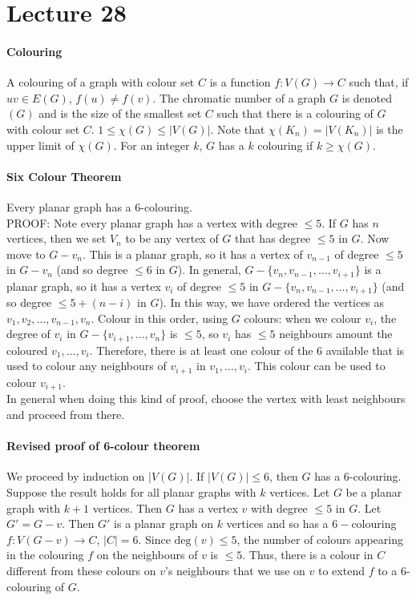 \documentclass[10pt,letter]{article}
\begin{document}
\section*{Lecture 28}
\paragraph{Colouring}
A colouring of a graph with colour set $C$ is a function $f:V(G)\rightarrow C$ such that, if $uv\in E(G)$, $f(u)\neq f(v)$. The chromatic number of a graph $G$ is denoted \raisebox{2pt}{$\chi$}$(G)$ and is the size of the smallest set $C$ such that there is a colouring of $G$ with colour set $C$. $1\leq\chi(G)\leq|V(G)|$. Note that $\chi(K_n)=|V(K_n)|$ is the upper limit of $\chi(G)$. For an integer $k$, $G$ has a $k$ colouring if $k\geq \chi(G)$. 
\paragraph{Six Colour Theorem}
Every planar graph has a 6-colouring. \\ 
PROOF: Note every planar graph has a vertex with degree $\leq5$. If $G$ has $n$ vertices, then we set $V_n$ to be any vertex of $G$ that has degree $\leq5$ in $G$. Now move to $G-v_n$. This is a planar graph, so it has a vertex of $v_{n-1}$ of degree $\leq5$ in $G-v_n$ (and so degree $\leq6$ in $G$). In general, $G-\{v_n,v_{n-1},\ldots,v_{i+1}\}$ is a planar graph, so it has a vertex $v_i$ of degree $\leq5$ in $G-\{v_n,v_{n-1},\ldots,v_{i+1}\}$ (and so degree $\leq5+(n-i)$ in $G$). In this way, we have ordered the vertices as $v_1,v_2,\ldots,v_{n-1},v_n$. Colour in this order, using $G$ colours: when we colour $v_i$, the degree of $v_i$ in $G-\{v_{i+1},\ldots,v_n\}$ is $\leq5$, so $v_i$ has $\leq5$ neighbours amount the coloured $v_1,\ldots,v_i$. Therefore, there is at least one colour of the 6 available that is used to colour any neighbours of $v_{i+1}$ in $v_1,\ldots,v_i$. This colour can be used to colour $v_{i+1}$.\\ 
In general when doing this kind of proof, choose the vertex with least neighbours and proceed from there.
\paragraph{Revised proof of 6-colour theorem}
We proceed by induction on $|V(G)|$. If $|V(G)|\leq6$, then $G$ has a 6-colouring. Suppose the result holds for all planar graphs with $k$ vertices. Let $G$ be a planar graph with $k+1$ vertices. Then $G$ has a vertex $v$ with degree $\leq5$ in $G$. Let $G'=G-v$. Then $G'$ is a planar graph on $k$ vertices and so has a $6-$colouring $f:V(G-v)\rightarrow C$, $|C|=6$. Since $\text{deg}(v)\leq5$, the number of colours appearing in the colouring $f$ on the neighbours of $v$ is $\leq5$. Thus, there is a colour in $C$ different from these colours on $v$'s neighbours that we use on $v$ to extend $f$ to a 6-colouring of $G$. 
\end{document}
